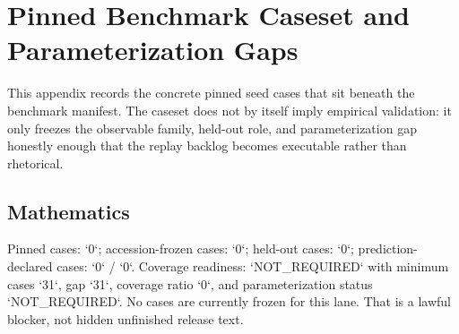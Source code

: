 \section{Pinned Benchmark Caseset and Parameterization Gaps}
\label{sec:oc-core-1-3-domain-benchmark-caseset}

This appendix records the concrete pinned seed cases that sit beneath the benchmark manifest. The caseset does not by itself imply empirical validation: it only freezes the observable family, held-out role, and parameterization gap honestly enough that the replay backlog becomes executable rather than rhetorical.

\begingroup
\footnotesize
\RaggedRight
\sloppy

\subsection{Mathematics}
Pinned cases: `0`; accession-frozen cases: `0`; held-out cases: `0`; prediction-declared cases: `0` / `0`.
Coverage readiness: `NOT\_REQUIRED` with minimum cases `31`, gap `31`, coverage ratio `0`, and parameterization status `NOT\_REQUIRED`.
No cases are currently frozen for this lane. That is a lawful blocker, not hidden unfinished release text.

